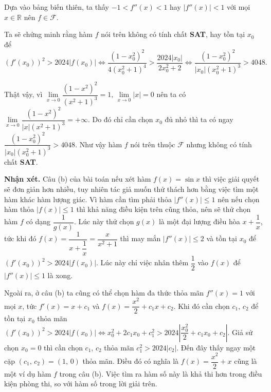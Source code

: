 \begin{enumerate}
{        Dựa vào bảng biến thiên, ta thấy $-1 < f''(x) < 1$ hay $|f''(x)| < 1$ với mọi $x \in \mathbb{R}$ nên $f\in \mathcal{F}$.

        Ta sẽ chứng minh rằng hàm $f$ nói trên không có tính chất \textbf{SAT}, hay tồn tại $x_0$ để $$\left(f'(x_0)\right)^2 > 2024|f(x_0)| \iff \dfrac{(1-x_0^2)^2}{4(x_0^2+1)^4} > \dfrac{2024|x_0|}{2x_0^2+2} \iff \dfrac{(1-x_0^2)^2}{|x_0|(x_0^2+1)^3}>4048.$$

        Thật vậy, vì $\lim\limits_{x \to 0} \dfrac{(1-x^2)^2}{(x^2+1)^3} = 1,\,\lim\limits_{x \to 0} |x| = 0$ nên ta có $\lim\limits_{x \to 0} \dfrac{(1-x^2)^2}{|x|(x^2+1)^3} = +\infty$. Do đó chỉ cần chọn $x_0$ đủ nhỏ thì ta có ngay $\dfrac{(1-x_0^2)^2}{|x_0|(x_0^2+1)^3}>4048$. Như vậy hàm $f$ nói trên thuộc $\mathcal{F}$ nhưng không có tính chất \textbf{SAT}.
    }
\end{enumerate}

\textbf{Nhận xét. }Câu (b) của bài toán nếu xét hàm $f(x) = \sin x$ thì việc giải quyết sẽ đơn giản hơn nhiều, tuy nhiên tác giả muốn thử thách hơn bằng việc tìm một hàm khác hàm lượng giác. Vì hàm cần tìm phải thỏa $|f''(x)| \leq 1$ nên nếu chọn hàm thỏa $|f(x)| \leq 1$ thì khả năng điều kiện trên cũng thỏa, nên sẽ thử chọn hàm $f$ có dạng $\dfrac{1}{g(x)}$. Lúc này thử chọn $g(x)$ là một đại lượng điều hòa $x + \dfrac{1}{x}$, tức khi đó $f(x) = \dfrac{1}{x + \dfrac{1}{x}} = \dfrac{x}{x^2 + 1}$ thì may mắn $|f''(x)| \leq 2$ và tồn tại $x_0$ để $\left(f'(x_0)\right)^2 > 2024|f(x_0)|$. Lúc này chỉ việc nhân thêm $\dfrac{1}{2}$ vào $f(x)$ để $|f''(x)| \leq 1$ là xong.

Ngoài ra, ở câu (b) ta cũng có thể chọn hàm đa thức thỏa mãn $f''(x) = 1$ với mọi $x$, tức $f'(x) = x + c_1$ và $f(x) = \dfrac{x^2}{2} + c_1x + c_2$. Khi đó cần chọn $c_1,\,c_2$ để tồn tại $x_0$ thỏa mãn $(f'(x_0))^2 > 2024|f(x_0)| \iff x_0^2 + 2c_1x_0 + c_1^2 > 2024\left|\dfrac{x_0^2}{2} + c_1x_0 + c_2\right|$. Giả sử chọn $x_0 = 0$ thì cần chọn $c_1,\,c_2$ thỏa mãn $c_1^2 > 2024|c_2|$. Đến đây thấy ngay một cặp $(c_1,\,c_2) = (1,\,0)$ thỏa mãn. Điều đó có nghĩa là $f(x) = \dfrac{x^2}{2} + x$ cũng là một ví dụ hàm $f$ trong câu (b). Việc tìm ra hàm số này là khả thi hơn trong điều kiện phòng thi, so với hàm số trong lời giải trên.

